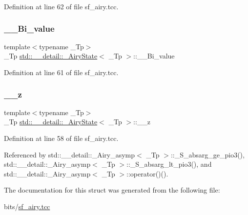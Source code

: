 Definition at line 62 of file sf\+\_\+airy.\+tcc.

\mbox{\label{structstd_1_1____detail_1_1__AiryState_a10ef7705b2b52a40502d75e62add672f}} 
\subsubsection{\texorpdfstring{\+\_\+\+\_\+\+Bi\+\_\+value}{\_\_Bi\_value}}
{\footnotesize\ttfamily template$<$typename \+\_\+\+Tp$>$ \\
\+\_\+\+Tp \hyperlink{structstd_1_1____detail_1_1__AiryState}{std\+::\+\_\+\+\_\+detail\+::\+\_\+\+Airy\+State}$<$ \+\_\+\+Tp $>$\+::\+\_\+\+\_\+\+Bi\+\_\+value}



Definition at line 61 of file sf\+\_\+airy.\+tcc.

\mbox{\label{structstd_1_1____detail_1_1__AiryState_a7606b501eba3f9b55aafa1706d7c9cc1}} 
\subsubsection{\texorpdfstring{\+\_\+\+\_\+z}{\_\_z}}
{\footnotesize\ttfamily template$<$typename \+\_\+\+Tp$>$ \\
\+\_\+\+Tp \hyperlink{structstd_1_1____detail_1_1__AiryState}{std\+::\+\_\+\+\_\+detail\+::\+\_\+\+Airy\+State}$<$ \+\_\+\+Tp $>$\+::\+\_\+\+\_\+z}



Definition at line 58 of file sf\+\_\+airy.\+tcc.



Referenced by std\+::\+\_\+\+\_\+detail\+::\+\_\+\+Airy\+\_\+asymp$<$ \+\_\+\+Tp $>$\+::\+\_\+\+S\+\_\+absarg\+\_\+ge\+\_\+pio3(), std\+::\+\_\+\+\_\+detail\+::\+\_\+\+Airy\+\_\+asymp$<$ \+\_\+\+Tp $>$\+::\+\_\+\+S\+\_\+absarg\+\_\+lt\+\_\+pio3(), and std\+::\+\_\+\+\_\+detail\+::\+\_\+\+Airy\+\_\+asymp$<$ \+\_\+\+Tp $>$\+::operator()().



The documentation for this struct was generated from the following file\+:\begin{DoxyCompactItemize}
\item 
bits/\hyperlink{sf__airy_8tcc}{sf\+\_\+airy.\+tcc}\end{DoxyCompactItemize}
